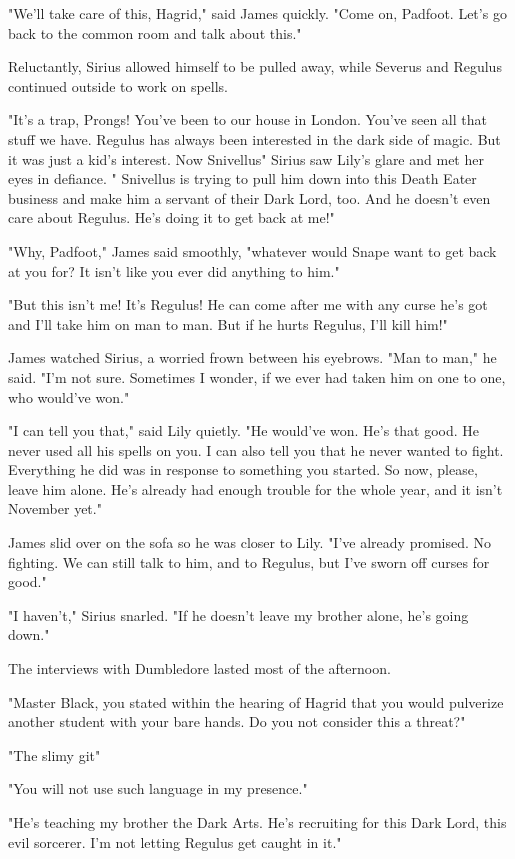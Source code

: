 "We'll take care of this, Hagrid," said James quickly. "Come on, Padfoot. Let's go back to the common room and talk about this."

Reluctantly, Sirius allowed himself to be pulled away, while Severus and Regulus continued outside to work on spells.

"It's a trap, Prongs! You've been to our house in London. You've seen all that stuff we have. Regulus has always been interested in the dark side of magic. But it was just a kid's interest. Now Snivellus{\el}" Sirius saw Lily's glare and met her eyes in defiance. "{\el} Snivellus is trying to pull him down into this Death Eater business and make him a servant of their Dark Lord, too. And he doesn't even care about Regulus. He's doing it to get back at me!"

"Why, Padfoot," James said smoothly, "whatever would Snape want to get back at you for? It isn't like you ever did anything to him."

"But this isn't me! It's Regulus! He can come after me with any curse he's got and I'll take him on man to man. But if he hurts Regulus, I'll kill him!"

James watched Sirius, a worried frown between his eyebrows. "Man to man," he said. "I'm not sure. Sometimes I wonder, if we ever had taken him on one to one, who would've won."

"I can tell you that," said Lily quietly. "He would've won. He's that good. He never used all his spells on you. I can also tell you that he never wanted to fight. Everything he did was in response to something you started. So now, please, leave him alone. He's already had enough trouble for the whole year, and it isn't November yet."

James slid over on the sofa so he was closer to Lily. "I've already promised. No fighting. We can still talk to him, and to Regulus, but I've sworn off curses for good."

"I haven't," Sirius snarled. "If he doesn't leave my brother alone, he's going down."

The interviews with Dumbledore lasted most of the afternoon.

"Master Black, you stated within the hearing of Hagrid that you would pulverize another student with your bare hands. Do you not consider this a threat?"

"The slimy git{\el}"

"You will not use such language in my presence."

"He's teaching my brother the Dark Arts. He's recruiting for this Dark Lord, this evil sorcerer. I'm not letting Regulus get caught in it."

